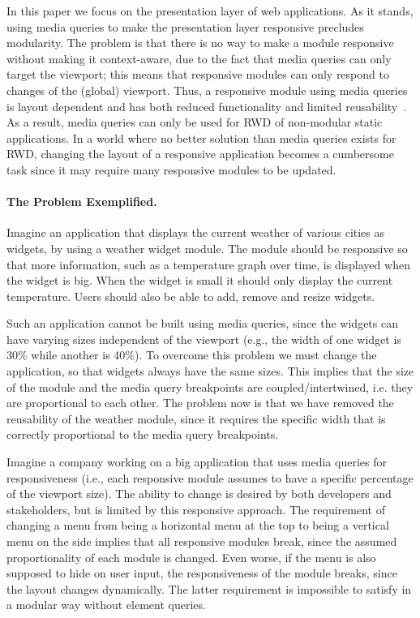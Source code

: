 \documentclass{llncs}
\begin{document}
  In this paper we focus on the presentation layer of web applications.
  As it stands, using media queries to make the presentation layer responsive precludes modularity.
  The problem is that there is no way to make a module responsive without making it context-aware, due to the fact that media queries can only target the viewport; this means that responsive modules can only respond to changes of the (global) viewport.
  Thus, a responsive module using media queries is layout dependent and has both reduced functionality and limited reusability~\cite{elq-thesis}.
  As a result, media queries can only be used for RWD of non-modular static applications.
  In a world where no better solution than media queries exists for RWD, changing the layout of a responsive application becomes a cumbersome task since it may require many responsive modules to be updated.

  \paragraph{The Problem Exemplified.}
    Imagine an application that displays the current weather of various cities as widgets, by using a weather widget module.
    The module should be responsive so that more information, such as a temperature graph over time, is displayed when the widget is big.
    When the widget is small it should only display the current temperature.
    Users should also be able to add, remove and resize widgets.

    Such an application cannot be built using media queries, since the widgets can have varying sizes independent of the viewport (e.g., the width of one widget is 30\% while another is 40\%).
    To overcome this problem we must change the application, so that widgets always have the same sizes.
    This implies that the size of the module and the media query breakpoints are coupled/intertwined, i.e. they are proportional to each other.
    The problem now is that we have removed the reusability of the weather module, since it requires the specific width that is correctly proportional to the media query breakpoints.

    Imagine a company working on a big application that uses media queries for responsiveness (i.e., each responsive module assumes to have a specific percentage of the viewport size).
    The ability to change is desired by both developers and stakeholders, but is limited by this responsive approach.
    The requirement of changing a menu from being a horizontal menu at the top to being a vertical menu on the side implies that all responsive modules break, since the assumed proportionality of each module is changed.
    Even worse, if the menu is also supposed to hide on user input, the responsiveness of the module breaks, since the layout changes dynamically.
    The latter requirement is impossible to satisfy in a modular way without element queries.
\end{document}
